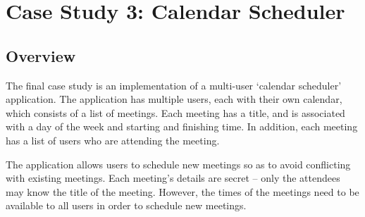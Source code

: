\section{Case Study 3: Calendar Scheduler}

%
%
%
%
%
%
%
%
%
%
%
%
%
%
%

\subsection{Overview}

The final case study is an implementation of a multi-user `calendar scheduler' application. The application has multiple users, each with their own calendar, which consists of a list of meetings. Each meeting has a title, and is associated with a day of the week and starting and finishing time. In addition, each meeting has a list of users who are attending the meeting.

The application allows users to schedule new meetings so as to avoid conflicting with existing meetings. Each meeting's details are secret -- only the attendees may know the title of the meeting. However, the times of the meetings need to be available to all users in order to schedule new meetings.

